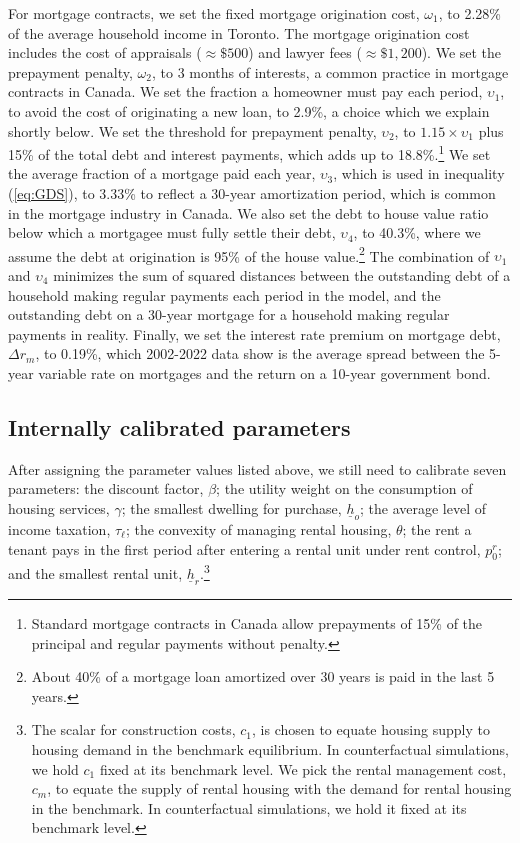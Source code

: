 \documentclass[parskip=full]{article}
\begin{document}
For mortgage contracts, we set the fixed mortgage origination cost, $\omega_{1}$, to 2.28\% of the average household income in Toronto. The mortgage origination cost includes the cost of appraisals ($\approx \$500$) and lawyer fees ($\approx \$1,200$). We set the prepayment penalty, $\omega_{2}$, to 3 months of interests, a common practice in mortgage contracts in Canada. We set the fraction a homeowner must pay each period, $\upsilon_{1}$, to avoid the cost of originating a new loan, to 2.9\%, a choice which we explain shortly below. We set the threshold for prepayment penalty, $\upsilon_{2}$, to $1.15 \times \upsilon_{1}$ plus 15\% of the total debt and interest payments, which adds up to 18.8\%.\footnote{Standard mortgage contracts in Canada allow prepayments of 15\% of the principal and regular payments without penalty.} We set the average fraction of a mortgage paid each year, $\upsilon_{3}$, which is used in inequality (\ref{eq:GDS}), to 3.33\% to reflect a 30-year amortization period, which is common in the mortgage industry in Canada. We also set the debt to house value ratio below which a mortgagee must fully settle their debt, $\upsilon_{4}$, to 40.3\%, where we assume the debt at origination is 95\% of the house value.\footnote{About 40\% of a mortgage loan amortized over 30 years is paid in the last 5 years.} The combination of $\upsilon_{1}$ and $\upsilon_{4}$ minimizes the sum of squared distances between the outstanding debt of a household making regular payments each period in the model, and the outstanding debt on a 30-year mortgage for a household making regular payments in reality. Finally, we set the interest rate premium on mortgage debt, $\Delta r_{m}$, to 0.19\%, which 2002-2022 data show is the average spread between the 5-year variable rate on mortgages and the return on a 10-year government bond.

\subsection{Internally calibrated parameters}

After assigning the parameter values listed above, we still need to calibrate seven parameters: the discount factor, $\beta$; the utility weight on the consumption of housing services, $\gamma$; the smallest dwelling for purchase, $\underline{h}_{o}$; the average level of income taxation, $\tau_{\ell}$; the convexity of managing rental housing, $\theta$; the rent a tenant pays in the first period after entering a rental unit under rent control, $p^{r}_{0}$; and the smallest rental unit, $\underline{h}_{r}$.\footnote{The scalar for construction costs, $c_{1}$, is chosen to equate housing supply to housing demand in the benchmark equilibrium. In counterfactual simulations, we hold $c_{1}$ fixed at its benchmark level. We pick the rental management cost, $c_{m}$, to equate the supply of rental housing with the demand for rental housing in the benchmark. In counterfactual simulations, we hold it fixed at its benchmark level.}
\end{document}
